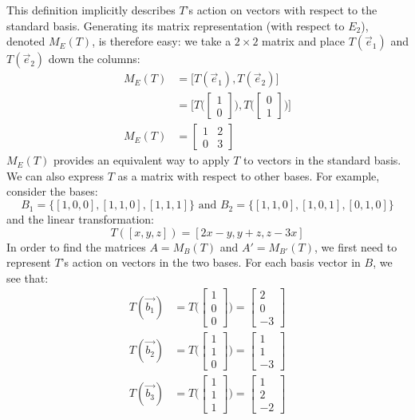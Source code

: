 \documentclass[11pt]{amsart}
\theoremstyle{definition}
\begin{document}
This definition implicitly describes $T$'s action on vectors with respect to the standard basis. Generating its matrix representation (with respect
to $E_2$), denoted $M_E(T)$, is therefore easy: we take a $2 \times 2$ matrix and place $T(\vec{e}_1)$ and $T(\vec{e}_2)$ down the columns:
\begin{align*}
	M_E(T) &= \big[ T(\vec{e}_1), T(\vec{e}_2) \big] \\
	&= \bigg[ T\bigg(\begin{bmatrix} 1 \\ 0 \end{bmatrix}\bigg), T\bigg(\begin{bmatrix} 0 \\ 1 \end{bmatrix}\bigg) \bigg] \\
	M_E(T) &= \begin{bmatrix} 1 & 2 \\ 0 & 3 \end{bmatrix}
\end{align*}
$M_E(T)$ provides an equivalent way to apply $T$ to vectors in the standard basis. We can also express $T$ as a matrix with respect to other
bases. For example, consider the bases:
\[
	B_1 = \{ [1, 0, 0], [1, 1, 0], [1, 1, 1] \} \text{ and } B_2 = \{ [1, 1, 0], [1, 0, 1], [0, 1, 0] \}
\]
and the linear transformation:
\[
	T([x, y, z]) = [2x - y, y + z, z - 3x]
\]
In order to find the matrices $A = M_B(T)$ and $A' = M_{B'}(T)$, we first need to represent $T$'s action on vectors in the two bases. For each
basis vector in $B$, we see that:
\begin{align*}
	T(\vec{b_1}) &= T\Bigg( \begin{bmatrix} 1 \\ 0 \\ 0 \end{bmatrix} \Bigg) = \begin{bmatrix} 2 \\ 0 \\ -3 \end{bmatrix} \\
	T(\vec{b_2}) &= T\Bigg( \begin{bmatrix} 1 \\ 1 \\ 0 \end{bmatrix} \Bigg) = \begin{bmatrix} 1 \\ 1 \\ -3 \end{bmatrix} \\
	T(\vec{b_3}) &= T\Bigg( \begin{bmatrix} 1 \\ 1 \\ 1 \end{bmatrix} \Bigg) = \begin{bmatrix} 1 \\ 2 \\ -2 \end{bmatrix}
\end{align*}
\end{document}

